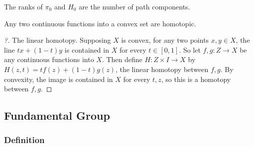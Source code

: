 \begin{fact}

The ranks of \(\pi_{0}\) and \(H_{0}\) are the number of path
components.

\end{fact}

\begin{theorem}

Any two continuous functions into a convex set are homotopic.

\end{theorem}

\begin{proof}[?]

The linear homotopy. Supposing \(X\) is convex, for any two points
\(x,y\in X\), the line \(tx + (1-t)y\) is contained in \(X\) for every
\(t\in[0,1]\). So let \(f, g: Z \to X\) be any continuous functions into
\(X\). Then define \(H: Z \times I \to X\) by
\(H(z,t) = tf(z) + (1-t)g(z)\), the linear homotopy between \(f,g\). By
convexity, the image is contained in \(X\) for every \(t,z\), so this is
a homotopy between \(f,g\).

\end{proof}

\hypertarget{fundamental-group}{%
\subsection{Fundamental Group}\label{fundamental-group}}

\hypertarget{definition}{%
\subsubsection{Definition}\label{definition}}

